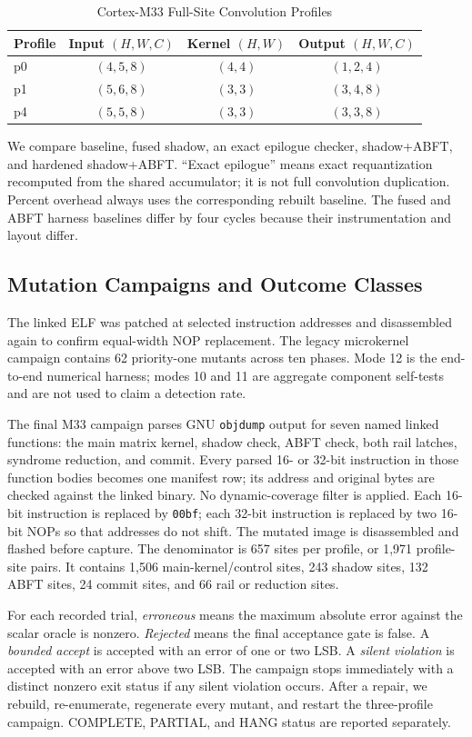 \documentclass[conference]{IEEEtran}
\begin{document}
\begin{table}[t]
\caption{Cortex-M33 Full-Site Convolution Profiles}
\label{tab:profiles}
\centering
\begin{tabular}{lccc}
\toprule
Profile & Input $(H,W,C)$ & Kernel $(H,W)$ & Output $(H,W,C)$\\
\midrule
p0 & $(4,5,8)$ & $(4,4)$ & $(1,2,4)$\\
p1 & $(5,6,8)$ & $(3,3)$ & $(3,4,8)$\\
p4 & $(5,5,8)$ & $(3,3)$ & $(3,3,8)$\\
\bottomrule
\end{tabular}
\end{table}

We compare baseline, fused shadow, an exact epilogue checker, shadow+ABFT, and hardened shadow+ABFT. ``Exact epilogue'' means exact requantization recomputed from the shared accumulator; it is not full convolution duplication. Percent overhead always uses the corresponding rebuilt baseline. The fused and ABFT harness baselines differ by four cycles because their instrumentation and layout differ.

\subsection{Mutation Campaigns and Outcome Classes}
The linked ELF was patched at selected instruction addresses and disassembled again to confirm equal-width NOP replacement. The legacy microkernel campaign contains 62 priority-one mutants across ten phases. Mode 12 is the end-to-end numerical harness; modes 10 and 11 are aggregate component self-tests and are not used to claim a detection rate.

The final M33 campaign parses GNU \texttt{objdump} output for seven named linked functions: the main matrix kernel, shadow check, ABFT check, both rail latches, syndrome reduction, and commit. Every parsed 16- or 32-bit instruction in those function bodies becomes one manifest row; its address and original bytes are checked against the linked binary. No dynamic-coverage filter is applied. Each 16-bit instruction is replaced by \texttt{00bf}; each 32-bit instruction is replaced by two 16-bit NOPs so that addresses do not shift. The mutated image is disassembled and flashed before capture. The denominator is 657 sites per profile, or 1,971 profile-site pairs. It contains 1,506 main-kernel/control sites, 243 shadow sites, 132 ABFT sites, 24 commit sites, and 66 rail or reduction sites.

For each recorded trial, \emph{erroneous} means the maximum absolute error against the scalar oracle is nonzero. \emph{Rejected} means the final acceptance gate is false. A \emph{bounded accept} is accepted with an error of one or two LSB. A \emph{silent violation} is accepted with an error above two LSB. The campaign stops immediately with a distinct nonzero exit status if any silent violation occurs. After a repair, we rebuild, re-enumerate, regenerate every mutant, and restart the three-profile campaign. COMPLETE, PARTIAL, and HANG status are reported separately.
\end{document}
